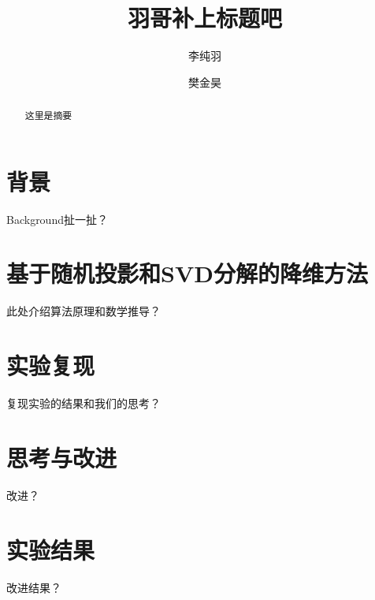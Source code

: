 \documentclass{ctexart}
\title{羽哥补上标题吧}
\author{李纯羽 \and 樊金昊}
\begin{document}
    \maketitle

    \begin{abstract}
        这里是摘要
    \end{abstract}
    \tableofcontents
    \newpage

    \section{背景}
    Background扯一扯？

    \section{基于随机投影和SVD分解的降维方法}
    此处介绍算法原理和数学推导？

    \section{实验复现}
    复现实验的结果和我们的思考？

    \section{思考与改进}
    改进？

    \section{实验结果}
    改进结果？

    \nocite{*} %
    
    
\end{document}
